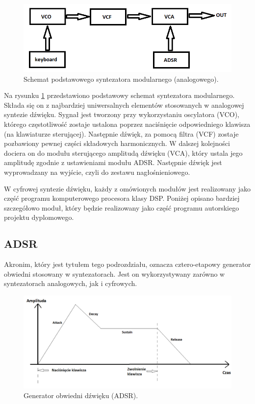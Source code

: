 \begin{figure}[H]
	\centering
	\includegraphics[width=12cm]{./grafiki/analog_synth_scheme}
	\captionsetup{justification=centering}
	\caption{Schemat podstawowego syntezatora modularnego (analogowego).}
	\label{rys:analog_scheme}
\end{figure}

Na rysunku \ref{rys:analog_scheme} przedstawiono podstawowy schemat syntezatora modularnego. Składa się on z najbardziej uniwersalnych elementów stosowanych w analogowej syntezie dźwięku. Sygnał jest tworzony przy wykorzystaniu oscylatora (VCO), którego częstotliwość zostaje ustalona poprzez naciśnięcie odpowiedniego klawisza (na klawiaturze sterującej). Następnie dźwięk, za pomocą filtra (VCF) zostaje pozbawiony pewnej części składowych harmonicznych. W dalszej kolejności dociera on do modułu sterującego amplitudą dźwięku (VCA), który ustala jego amplitudę zgodnie z ustawieniami modułu ADSR. Następnie dźwięk jest wyprowadzany na wyjście, czyli do zestawu nagłośnieniowego.

W cyfrowej syntezie dźwięku, każdy z omówionych modułów jest realizowany jako część programu komputerowego procesora klasy DSP. Poniżej opisano bardziej szczegółowo moduł, który będzie realizowany jako część programu autorskiego projektu dyplomowego.

\subsection{ADSR}
Akronim, który jest tytułem tego podrozdziału, oznacza cztero-etapowy generator obwiedni stosowany w syntezatorach. Jest on wykorzystywany zarówno w syntezatorach analogowych, jak i cyfrowych.

\begin{figure}[H]
	\centering
	\includegraphics[width=12cm]{./grafiki/ADSR2}
	\captionsetup{justification=centering}
	\caption{Generator obwiedni dźwięku (ADSR).}
	\label{rys:ADSR}
\end{figure}

